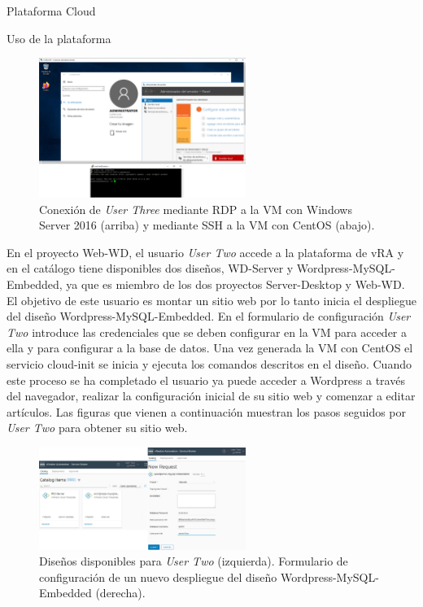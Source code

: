 \begin{subsection}{Plataforma Cloud}
\begin{subsubsection}{Uso de la plataforma}
        \begin{figure}[h]
            \centering
            \includegraphics[width=0.6\textwidth]{imaxes/pruebaconcepto/vrealize/Windows-RDP.png}
            \caption{Conexión de \textit{User Three} mediante RDP a la VM con Windows Server 2016 (arriba) y mediante SSH a la VM con CentOS (abajo).}
            \label{fig:vm-cent-win-connection}
        \end{figure}
        \FloatBarrier
        En el proyecto Web-WD, el usuario \textit{User Two} accede a la plataforma de vRA y en el catálogo tiene disponibles dos diseños, WD-Server y Wordpress-MySQL-Embedded, ya que es miembro de los dos proyectos Server-Desktop y Web-WD. El objetivo de este usuario es montar un sitio web por lo tanto inicia el despliegue del diseño Wordpress-MySQL-Embedded. En el formulario de configuración \textit{User Two} introduce las credenciales que se deben configurar en la VM para acceder a ella y para configurar a la base de datos. Una vez generada la VM con CentOS el servicio cloud-init se inicia y ejecuta los comandos descritos en el diseño. Cuando este proceso se ha completado el usuario ya puede acceder a Wordpress a través del navegador, realizar la configuración inicial de su sitio web y comenzar a editar artículos. Las figuras que vienen a continuación muestran los pasos seguidos por \textit{User Two} para obtener su sitio web.
        \begin{figure}[h]
            \centering
            \includegraphics[width=0.6\textwidth]{imaxes/pruebaconcepto/vrealize/user-two-catalog.png}
            \caption{Diseños disponibles para \textit{User Two} (izquierda). Formulario de configuración de un nuevo despliegue del diseño Wordpress-MySQL-Embedded (derecha).}

\end{figure}
\end{subsubsection}
\end{subsection}
